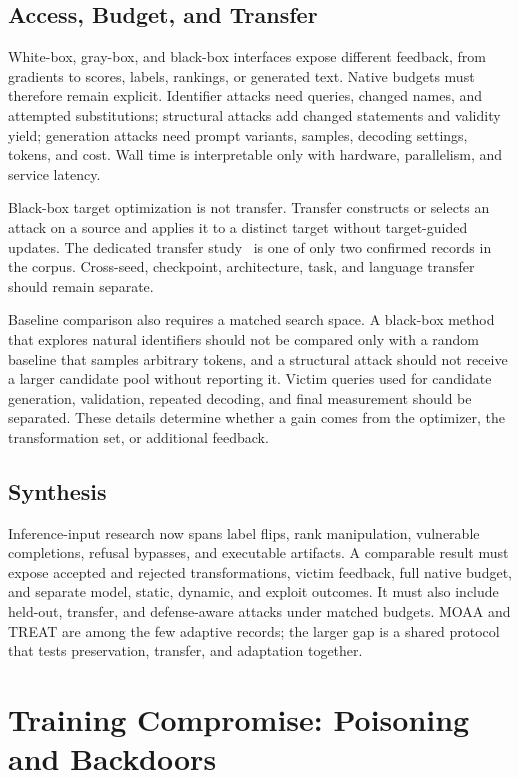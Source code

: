 \documentclass[acmsmall,screen,review]{acmart}
\begin{document}
\subsection{Access, Budget, and Transfer}
White-box, gray-box, and black-box interfaces expose different feedback, from gradients to scores, labels, rankings, or generated text. Native budgets must therefore remain explicit. Identifier attacks need queries, changed names, and attempted substitutions; structural attacks add changed statements and validity yield; generation attacks need prompt variants, samples, decoding settings, tokens, and cost. Wall time is interpretable only with hardware, parallelism, and service latency.

Black-box target optimization is not transfer. Transfer constructs or selects an attack on a source and applies it to a distinct target without target-guided updates. The dedicated transfer study~\cite{transfer2024coding} is one of only two confirmed records in the corpus. Cross-seed, checkpoint, architecture, task, and language transfer should remain separate.

Baseline comparison also requires a matched search space. A black-box method that explores natural identifiers should not be compared only with a random baseline that samples arbitrary tokens, and a structural attack should not receive a larger candidate pool without reporting it. Victim queries used for candidate generation, validation, repeated decoding, and final measurement should be separated. These details determine whether a gain comes from the optimizer, the transformation set, or additional feedback.

\subsection{Synthesis}
Inference-input research now spans label flips, rank manipulation, vulnerable completions, refusal bypasses, and executable artifacts. A comparable result must expose accepted and rejected transformations, victim feedback, full native budget, and separate model, static, dynamic, and exploit outcomes. It must also include held-out, transfer, and defense-aware attacks under matched budgets. MOAA and TREAT are among the few adaptive records; the larger gap is a shared protocol that tests preservation, transfer, and adaptation together.

\section{Training Compromise: Poisoning and Backdoors} \label{sec:poison}
\end{document}
